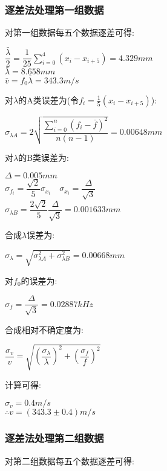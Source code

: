 \documentclass[a4 paper,12pt]{article}
\begin{document}
\subsubsection{逐差法处理第一组数据}
\noindent
对第一组数据每五个数据逐差可得:

\begin{center}
	$\dfrac{\bar{\lambda}}{2}=\dfrac{1}{25}\sum\limits_{i=0}^{4}(x_{i}-x_{i+5})=4.329mm$\\
	$\bar{\lambda}=8.658mm$\\
	$\bar{v}=f_{0}\bar{\lambda}=343.3m/s$
\end{center}
对$\lambda$的A类误差为(令$f_{i}=\frac{1}{5}(x_{i}-x_{i+5})$):
\begin{center}
	$\sigma_{\lambda A}=2\sqrt{\dfrac{\sum\limits_{i=0}^{n}(f_{i}-\bar{f})^{2}}{n(n-1)}}=0.00648mm$
\end{center}
对$\lambda$的B类误差为:
\begin{center}
	$\Delta=0.005mm$\\
	$\sigma_{f_{i}}=\dfrac{\sqrt{2}}{5}\sigma_{x_{i}}\quad \sigma_{x_{i}}=\dfrac{\Delta}{\sqrt{3}}$\\
	$\sigma_{\lambda B}=\dfrac{2\sqrt{2}}{5}\dfrac{\Delta}{\sqrt{3}}=0.001633mm$
\end{center}
合成$\lambda$误差为:
\begin{center}
	$\sigma_{\lambda}=\sqrt{\sigma_{\lambda A}^{2}+\sigma_{\lambda B}^{2}}=0.00668mm$
\end{center}
对$f_{0}$的误差为:
\begin{center}
	$\sigma_{f}=\dfrac{\Delta}{\sqrt{3}}=0.02887kHz$
\end{center}
合成相对不确定度为:
\begin{center}
	$\dfrac{\sigma_{v}}{v}=\sqrt{(\dfrac{\sigma_{\lambda}}{\lambda})^{2}+(\dfrac{\sigma_{f}}{f})^{2}}$
\end{center}
计算可得:
\begin{center}
	$\sigma_{v}=0.4m/s$\\
	$\therefore v=(343.3\pm 0.4)m/s$
\end{center}
\subsubsection{逐差法处理第二组数据}
\noindent
对第二组数据每五个数据逐差可得:
\end{document}
